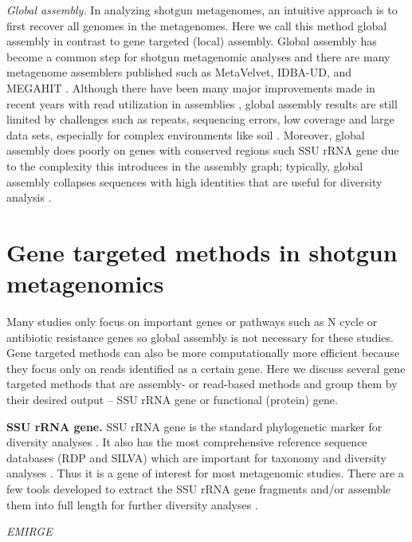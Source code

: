 \documentclass[]{msu-thesis}
\begin{document}
\textit{Global assembly. } In analyzing shotgun metagenomes, an
intuitive approach is to first recover all genomes in the metagenomes. Here
we call this method global assembly in contrast to gene targeted
(local) assembly. Global assembly has become a common step for shotgun
metagenomic analyses and there are many metagenome assemblers
published such as MetaVelvet, IDBA-UD, and MEGAHIT
\cite{li_megahit:_2015,namiki_metavelvet:_2012,peng_idba-ud:_2012}.
Although there have been many major improvements made in recent years with read utilization in assemblies
\cite{li_megahit:_2015}, global assembly results are still limited by
challenges such as repeats, sequencing errors, low coverage and
large data sets, especially for complex environments like soil
\cite{howe_tackling_2014}. Moreover, global assembly does poorly on
genes with conserved regions such SSU rRNA gene due to the complexity
this introduces in the assembly graph; typically, global assembly
collapses sequences with high identities
that are useful for diversity analysis
\cite{guo_microbial_2015,miller_emirge:_2011}.

\section{Gene targeted methods in shotgun metagenomics}

Many studies only focus on important genes or pathways such as N cycle or
antibiotic resistance genes so global assembly is not necessary for these
studies.  Gene targeted methods can also be more computationally more efficient
because they focus only on reads identified as a certain gene. Here we discuss
several gene targeted methods that are assembly- or read-based methods and
group them by their desired output -- SSU rRNA gene or functional (protein)
gene.

\textbf{SSU rRNA gene. } SSU rRNA gene is the standard
phylogenetic marker for diversity analyses
\cite{lane_rapid_1985,huse_exploring_2008}. It also has the most comprehensive
reference sequence databases (RDP and SILVA) which are important
for taxonomy and diversity analyses
\cite{cole_ribosomal_2014,quast_silva_2013}. Thus it is a gene of
interest for most metagenomic studies. There are a few tools developed
to extract the SSU rRNA gene fragments and/or assemble them into full
length for further diversity analyses
\cite{miller_emirge:_2011,yuan_reconstructing_2015,guo_microbial_2015}.

\textit{EMIRGE}
\end{document}
